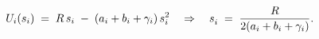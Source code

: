 \[
U_i(s_i) \;=\; R\,s_i \;-\; (a_i+b_i+\gamma_i)\,s_i^2
\quad\Rightarrow\quad
s_i^{\*} \;=\; \frac{R}{2(a_i+b_i+\gamma_i)}.
\]
